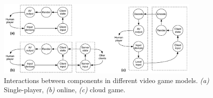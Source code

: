 \begin{figure}[!t]
  \centering
  \includegraphics[width=0.9\textwidth]{../../../models/component_interaction_full.pdf}
  \caption{Interactions between components in different video game models. \textit{(a)} Single-player, \textit{(b)} online, \textit{(c)} cloud game.}
  \label{fig:component-models}
\end{figure}
